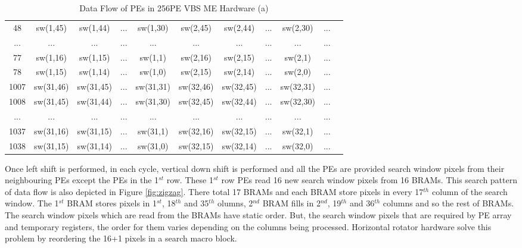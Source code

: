 \begin{table}[H]
\begin{tabular}{|c|c|c|c|c|c|c|c|c|c|c|}
		48 & sw(1,45) & sw(1,44) & ... & sw(1,30) & sw(2,45) & sw(2,44) & ... & sw(2,30) & ... \\
		
		... & ... & ... & ... & ... & ... & ... & ... & ... & ... \\
		
		77 & sw(1,16) & sw(1,15) & ... & sw(1,1) & sw(2,16) & sw(2,15) & ... & sw(2,1) & ... \\
		
		78 & sw(1,15) & sw(1,14) & ... & sw(1,0) & sw(2,15) & sw(2,14) & ... & sw(2,0) & ... \\
		
		\hline
		
		1007 & sw(31,46) & sw(31,45) & ... & sw(31,31) & sw(32,46) & sw(32,45) & ... & sw(32,31) & ... \\
		
		1008 & sw(31,45) & sw(31,44) & ... & sw(31,30) & sw(32,45) & sw(32,44) & ... & sw(32,30) & ... \\
		
		... & ... & ... & ... & ... & ... & ... & ... & ... & ... \\
		
		1037 & sw(31,16) & sw(31,15) & ... & sw(31,1) & sw(32,16) & sw(32,15) & ... & sw(32,1) & ... \\
		
		1038 & sw(31,15) & sw(31,14) & ... & sw(31,0) & sw(32,15) & sw(32,14) & ... & sw(32,0) & ... \\
		
		\hline
	\end{tabular}
	\caption{ Data Flow of PEs in 256PE VBS ME Hardware (a)}
	\label{tab:dataflow1}
\end{table}

Once left shift is performed, in each cycle, vertical down shift is performed and all the PEs are provided search window pixels from their neighbouring PEs except the PEs in the 1$^{st}$ row.  These 1$^{st}$ row PEs read 16 new search window pixels from 16 BRAMs. This search pattern of data flow is also depicted in Figure \ref{fig:zigzag}. There total 17 BRAMs and each BRAM store pixels in every 17$^{th}$ column of the search window. The 1$^{st}$ BRAM stores pixels in 1$^{st}$, 18$^{th}$ and 35$^{th}$ olumns, 2$^{nd}$ BRAM fills in 2$^{nd}$, 19$^{th}$ and 36$^{th}$ columns and so the rest of BRAMs. The search window pixels which are read from the BRAMs have static order. But, the search window pixels that are required by PE array and temporary registers, the order for them varies depending on the columns being processed. Horizontal rotator hardware solve this problem by reordering the 16+1 pixels in a search macro block.

